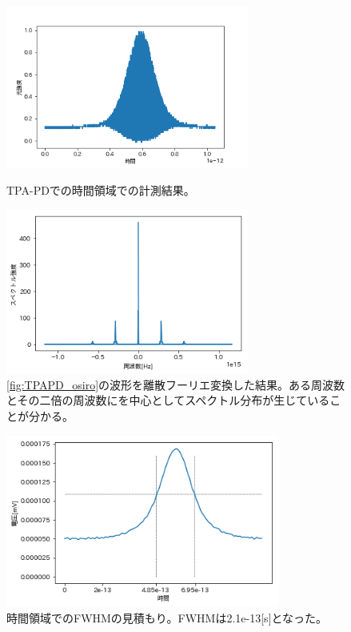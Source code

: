 \documentclass[titlepage]{jsarticle}
\begin{document}
\begin{figure}[htbp]
 \begin{minipage}{0.5\hsize}
  \begin{center}
   \includegraphics[width=80mm]{TPAPD.png}
  \end{center}
  \caption{TPA-PDでの時間領域での計測結果。}
  \label{fig:TPAPD_osiro}
 \end{minipage}
 \begin{minipage}{0.5\hsize}
  \begin{center}
   \includegraphics[width=80mm]{TPAPD_spectrum.png}
  \end{center}
  \caption{\ref{fig:TPAPD_osiro}の波形を離散フーリエ変換した結果。ある周波数とその二倍の周波数にを中心としてスペクトル分布が生じていることが分かる。}
  \label{fig:TPAPDspectrum}
 \end{minipage}
\end{figure}

\begin{figure}[htbp]
 \begin{minipage}{0.5\hsize}
  \begin{center}
   \includegraphics[width=90mm]{FWHM.png}
  \end{center}
  \caption{時間領域でのFWHMの見積もり。FWHMは2.1e-13[s]となった。}
  \label{FWHM} \end{minipage}
\end{figure}
\clearpage
\end{document}
